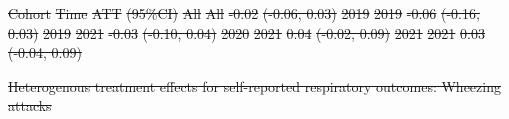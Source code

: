 \documentclass[
  letterpaper,
  DIV=11,
  numbers=noendperiod]{scrartcl}
\makeatletter
\renewenvironment{table}%
   {\renewcommand\familydefault\sfdefault
    \@float{table}}
   {\end@float}
\providecommand{\DIFdeltex}[1]{{\protect\color{red}\sout{#1}}}                      %
\providecommand{\DIFdelFL}[1]{\DIFdel{#1}} %
\providecommand{\DIFdel}[1]{\texorpdfstring{\DIFdeltex{#1}}{}} %
\makeatother
\begin{document}
\DIFdelFL{Cohort }%
\DIFdelFL{Time }%
\DIFdelFL{ATT }%
\DIFdelFL{(95\%CI)}%
\DIFdelFL{All }%
\DIFdelFL{All }%
\DIFdelFL{-0.02 }%
\DIFdelFL{(-0.06, 0.03)}%
\DIFdelFL{2019 }%
\DIFdelFL{2019 }%
\DIFdelFL{-0.06 }%
\DIFdelFL{(-0.16, 0.03)}%
\DIFdelFL{2019 }%
\DIFdelFL{2021 }%
\DIFdelFL{-0.03 }%
\DIFdelFL{(-0.10, 0.04)}%
\DIFdelFL{2020 }%
\DIFdelFL{2021 }%
\DIFdelFL{0.04 }%
\DIFdelFL{(-0.02, 0.09)}%
\DIFdelFL{2021 }%
\DIFdelFL{2021 }%
\DIFdelFL{0.03 }%
\DIFdelFL{(-0.04, 0.09)}%

{%
\DIFdelFL{Heterogenous treatment effects for self-reported respiratory outcomes:
Wheezing attacks }}%
\end{document}
